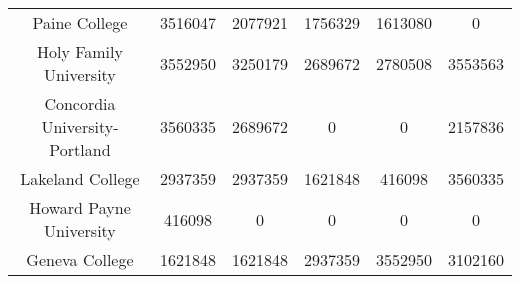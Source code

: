 \documentclass{mcmthesis}
\begin{document}
\begin{appendices}
\begin{table}[h]
\begin{tabular}{cccccc}
Paine College & 3516047 & 2077921 & 1756329 & 1613080 & 0\\
Holy Family University & 3552950 & 3250179 & 2689672 & 2780508 & 3553563\\
Concordia University-Portland & 3560335 & 2689672 & 0 & 0 & 2157836\\
Lakeland College & 2937359 & 2937359 & 1621848 & 416098 & 3560335\\
Howard Payne University & 416098 & 0 & 0 & 0 & 0\\
Geneva College & 1621848 & 1621848 & 2937359 & 3552950 & 3102160\\
\bottomrule
\end{tabular}
\end{table}

\end{appendices}
\end{document}
